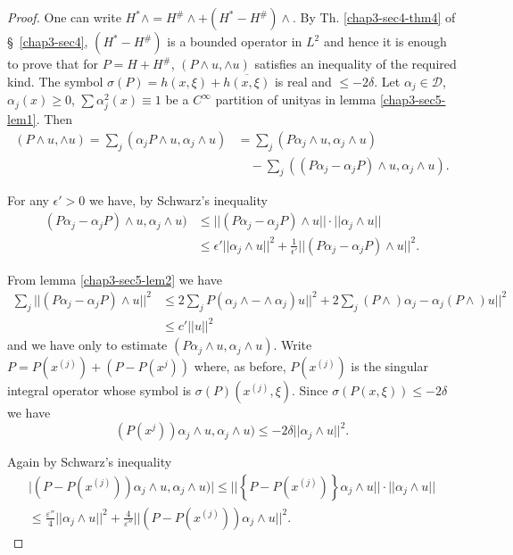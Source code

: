 \begin{proof}%
One can write $ H^* \wedge = H^{\#} \wedge + (H^* - H^{\#}) \wedge $. By
Th. \ref{chap3-sec4-thm4} of \S\ \ref{chap3-sec4}, $(H^*-H^{\#})$
is a bounded operator in $L^2$ and hence 
it is enough to prove that for $P = H + H^{\#}$, $(P \wedge u, \wedge
u)$ satisfies an inequality of the required kind. The symbol
$\sigma(P) = h(x,\xi) + \overline{h(x,\xi)}$ is real and $\leq - 2
\delta$. Let $\alpha_j \in \mathscr{D}$, $\alpha_{j}(x) \geq 0$,
$\sum \alpha^2_j (x) \equiv 1$ be a $C^\infty$ partition of  
unity\pageoriginale as in lemma \ref{chap3-sec5-lem1}. Then 
\begin{align*}
(P \wedge u, \wedge u) = \sum\limits_j (\alpha_j P \wedge u, \alpha_j
\wedge u) & = \sum\limits_j (P \alpha_j \wedge u, \alpha_j \wedge u)\\
&\quad - \sum\limits_j ((P \alpha_j - \alpha_j P) \wedge u, \alpha_j \wedge  
u). 
\end{align*}

For any $\epsilon' > 0 $ we have, by Schwarz's inequality
\begin{align*}
(P \alpha_j - \alpha_j P) \wedge u, \alpha_j \wedge u) & \leq || (P
  \alpha_j - \alpha_j P) \wedge u|| \cdot || \alpha_j \wedge u || \\
& \leq \epsilon' || \alpha_j \wedge u ||^2 + \frac{1}{\epsilon'}|| (P 
  \alpha_j-\alpha_j P) \wedge u||^2. 
\end{align*}

From lemma \ref{chap3-sec5-lem2} we have 
{\fontsize{10pt}{12pt}\selectfont
\begin{align*}
\sum\limits_j || (P \alpha_j - \alpha_j P) \wedge u||^2 & \leq 2
\sum\limits_j P(\alpha_j \wedge - \wedge \alpha_j ) u||^2 + 2
\sum\limits_j (P \wedge ) \alpha_j - \alpha_j (P \wedge ) u ||^2 \\ 
&  \leq c' ||u||^2
\end{align*}}\relax
and we have only to estimate $(P \alpha_j \wedge u, \alpha_j \wedge
u)$. Write $P=P(x^{(j)}) + (P-P(x^{j}))$ where, as before,
$P(x^{(j)})$ is the singular integral operator whose symbol is $\sigma
(P) (x^{(j)}, \xi)$. Since $\sigma (P(x, \xi )) \leq - 2 \delta $ we
have  
$$
(P(x^{j})) \alpha_j \wedge u, \alpha_j \wedge u) \leq -2 \delta ||
\alpha_j\wedge u ||^2. 
$$

Again by Schwarz's inequality
\begin{gather*}
\big|(P- P(x^{(j)})) \alpha_j \wedge u, \alpha_j \wedge u )\big| \leq
|| \left\{ P-P(x^{(j)})\right\} \alpha_j \wedge u || \cdot || \alpha_j
\wedge u ||\\  
 \leq \frac{\varepsilon''}{4}|| \alpha_j \wedge u ||^2 +
 \frac{4}{\varepsilon''}|| (P- P(x^{(j)})) \alpha_j \wedge u ||^2. 
\end{gather*}


\end{proof}
